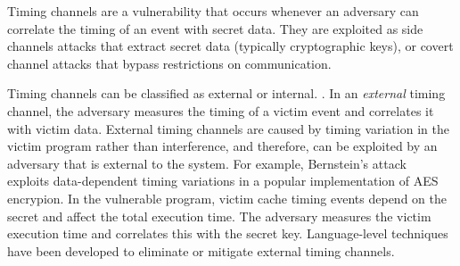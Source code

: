 Timing channels are a vulnerability that occurs whenever an adversary can 
correlate the timing of an event with secret data.
They are exploited as side channels attacks that extract secret data (typically 
cryptographic keys), or covert channel attacks that bypass restrictions on 
communication.


Timing channels can be classified as external or internal.
\cite{mitigation3}.  In an {\em external} timing channel, the adversary measures 
the timing of a victim event and correlates it with victim data. 
External 
timing channels are caused by timing variation in the victim program rather 
than interference, and therefore, can be exploited by an adversary that is 
external to the system.
For example, Bernstein's attack~\cite{bernstein} exploits data-dependent
timing variations in a popular implementation of AES encrypion.  In the 
vulnerable program, victim cache timing events depend on the secret and affect 
the total execution time. The adversary measures the victim execution time and 
correlates this with the secret key.
Language-level techniques have been developed to
eliminate \cite{timesens} or mitigate \cite{mitigation1,mitigation2,mitigation3} 
external timing channels.

